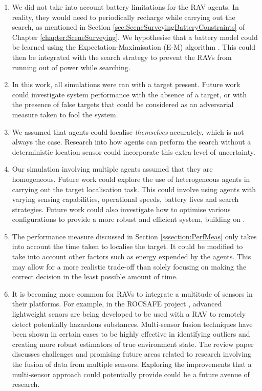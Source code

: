 \begin{enumerate}

    \item We did not take into account battery limitations for the RAV agents. In reality, they would need to periodically recharge while carrying out the search, as mentioned in Section \ref{sec:SceneSurveyingBatteryConstraints} of Chapter \ref{chapter:SceneSurveying}. We hypothesise that a battery model could be learned using the Expectation-Maximisation (E-M) algorithm \cite{Dempster1977MaximumAlgorithm}. This could then be integrated with the search strategy to prevent the RAVs from running out of power while searching.
    \item In this work, all simulations were ran with a target present. Future work could investigate system performance with the absence of a target, or with the presence of false targets that could be considered as an adversarial measure taken to fool the system.
    \item We assumed that agents could localise \textit{themselves} accurately, which is not always the case. Research into how agents can perform the search without a deterministic location sensor could incorporate this extra level of uncertainty.
    \item Our simulation involving multiple agents assumed that they are homogeneous. Future work could explore the use of heterogeneous agents in carrying out the target localisation task. This could involve using agents with varying sensing capabilities, operational speeds, battery lives and search strategies. Future work could also investigate how to optimise various configurations to provide a more robust and efficient system, building on \cite{Chung2008Multi-agentFramework}.
    \item The performance measure discussed in Section \ref{sssection:PerfMeas} only takes into account the time taken to localise the target. It could be modified to take into account other factors such as energy expended by the agents. This may allow for a more realistic trade-off than solely focusing on making the correct decision in the least possible amount of time.
    \item It is becoming more common for RAVs to integrate a multitude of sensors in their platforms. For example, in the ROCSAFE project \cite{Bagherzadeh2017ROCSAFE:Incidents}, advanced lightweight senors are being developed to be used with a RAV to remotely detect potentially hazardous substances. Multi-sensor fusion techniques have been shown in certain cases to be highly effective in identifying outliers and creating more robust estimators of true environment state. The review paper \cite{Khaleghi2013MultisensorState-of-the-art} discusses challenges and promising future areas related to research involving the fusion of data from multiple sensors. Exploring the improvements that a multi-sensor approach could potentially provide could be a future avenue of research.

\end{enumerate}
